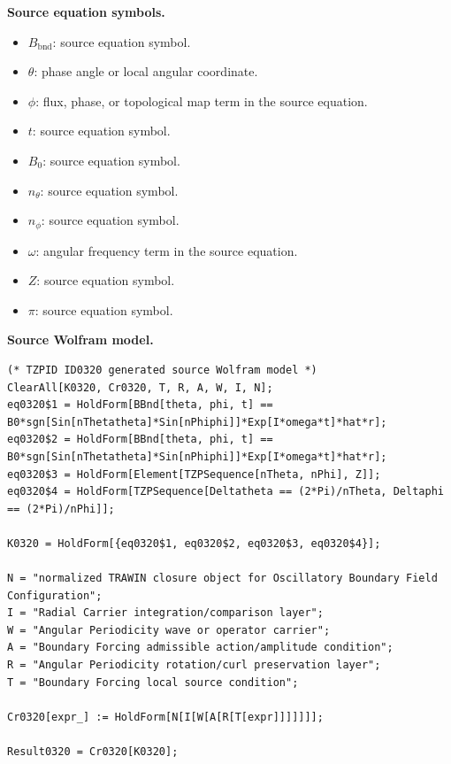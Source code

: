 \begin{minipage}[t]{0.49\linewidth}
\begingroup
\small
\raggedright
\textbf{Source equation symbols.}\par
\begin{itemize}[leftmargin=1.35em,itemsep=1pt,topsep=1pt,parsep=0pt]
    \item $B_{\mathrm{bnd}}$: source equation symbol.
    \item $\theta$: phase angle or local angular coordinate.
    \item $\phi$: flux, phase, or topological map term in the source equation.
    \item $t$: source equation symbol.
    \item $B_{0}$: source equation symbol.
    \item $n_{\theta}$: source equation symbol.
    \item $n_{\phi}$: source equation symbol.
    \item $\omega$: angular frequency term in the source equation.
    \item $Z$: source equation symbol.
    \item $\pi$: source equation symbol.
\end{itemize}
\endgroup
\end{minipage}\hfill
\begin{minipage}[t]{0.47\linewidth}
\begingroup
\scriptsize
\raggedright
\textbf{Source Wolfram model.}\par
\begin{Verbatim}[fontsize=\tiny,breaklines=true,breakanywhere=true]
(* TZPID ID0320 generated source Wolfram model *)
ClearAll[K0320, Cr0320, T, R, A, W, I, N];
eq0320$1 = HoldForm[BBnd[theta, phi, t] == B0*sgn[Sin[nThetatheta]*Sin[nPhiphi]]*Exp[I*omega*t]*hat*r];
eq0320$2 = HoldForm[BBnd[theta, phi, t] == B0*sgn[Sin[nThetatheta]*Sin[nPhiphi]]*Exp[I*omega*t]*hat*r];
eq0320$3 = HoldForm[Element[TZPSequence[nTheta, nPhi], Z]];
eq0320$4 = HoldForm[TZPSequence[Deltatheta == (2*Pi)/nTheta, Deltaphi == (2*Pi)/nPhi]];

K0320 = HoldForm[{eq0320$1, eq0320$2, eq0320$3, eq0320$4}];

N = "normalized TRAWIN closure object for Oscillatory Boundary Field Configuration";
I = "Radial Carrier integration/comparison layer";
W = "Angular Periodicity wave or operator carrier";
A = "Boundary Forcing admissible action/amplitude condition";
R = "Angular Periodicity rotation/curl preservation layer";
T = "Boundary Forcing local source condition";

Cr0320[expr_] := HoldForm[N[I[W[A[R[T[expr]]]]]]];

Result0320 = Cr0320[K0320];
\end{Verbatim}
\endgroup
\end{minipage}

